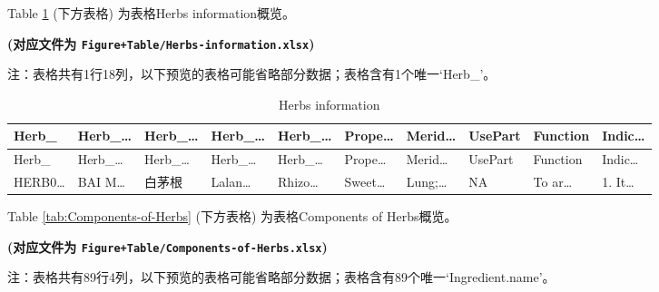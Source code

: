 \documentclass[
]{article}
\begin{document}
Table \ref{tab:Herbs-information} (下方表格) 为表格Herbs information概览。

\textbf{(对应文件为 \texttt{Figure+Table/Herbs-information.xlsx})}

\begin{center}\begin{tcolorbox}[colback=gray!10, colframe=gray!50, width=0.9\linewidth, arc=1mm, boxrule=0.5pt]注：表格共有1行18列，以下预览的表格可能省略部分数据；表格含有1个唯一`Herb\_'。
\end{tcolorbox}
\end{center}

\begin{longtable}[]{@{}llllllllll@{}}
\caption{\label{tab:Herbs-information}Herbs information}\tabularnewline
\toprule
Herb\_ & Herb\_\ldots{} & Herb\_\ldots{} & Herb\_\ldots{} & Herb\_\ldots{} & Prope\ldots{} & Merid\ldots{} & UsePart & Function & Indic\ldots{}\tabularnewline
\midrule
\endfirsthead
\toprule
Herb\_ & Herb\_\ldots{} & Herb\_\ldots{} & Herb\_\ldots{} & Herb\_\ldots{} & Prope\ldots{} & Merid\ldots{} & UsePart & Function & Indic\ldots{}\tabularnewline
\midrule
\endhead
HERB0\ldots{} & BAI M\ldots{} & 白茅根 & Lalan\ldots{} & Rhizo\ldots{} & Sweet\ldots{} & Lung;\ldots{} & NA & To ar\ldots{} & 1. It\ldots{}\tabularnewline
\bottomrule
\end{longtable}

Table \ref{tab:Components-of-Herbs} (下方表格) 为表格Components of Herbs概览。

\textbf{(对应文件为 \texttt{Figure+Table/Components-of-Herbs.xlsx})}

\begin{center}\begin{tcolorbox}[colback=gray!10, colframe=gray!50, width=0.9\linewidth, arc=1mm, boxrule=0.5pt]注：表格共有89行4列，以下预览的表格可能省略部分数据；表格含有89个唯一`Ingredient.name'。
\end{tcolorbox}
\end{center}
\end{document}

